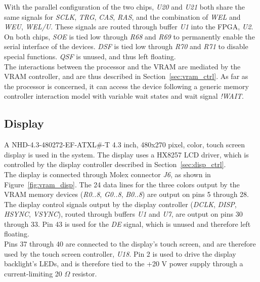 \documentclass[titlepage]{scrartcl}
\begin{document}
	With the parallel configuration of the two chips, \textit{U20} and \textit{U21} both share the same signals for \textit{SCLK}, \textit{TRG}, \textit{CAS}, \textit{RAS}, and the combination of \textit{WEL} and \textit{WEU}, \textit{WEL/U}. These signals are routed through buffer \textit{U1} into the FPGA, \textit{U2}.\\

	On both chips, \textit{SOE} is tied low through \textit{R68} and \textit{R69} to permanently enable the serial interface of the devices. \textit{DSF} is tied low through \textit{R70} and \textit{R71} to disable special functions. \textit{QSF} is unused, and thus left floating.\\

	The interactions between the processor and the VRAM are mediated by the VRAM controller, and are thus described in Section~\ref{sec:vram_ctrl}. As far as the processor is concerned, it can access the device following a generic memory controller interaction model with variable wait states and wait signal \textit{!WAIT}. \\

	\clearpage

	\subsection{Display}
	A NHD-4.3-480272-EF-ATXL\#-T 4.3 inch, 480x270 pixel, color, touch screen display is used in the system. The display uses a HX8257 LCD driver, which is controlled by the display controller described in Section~\ref{sec:disp_ctrl}.\\

	The display is connected through Molex connector \textit{J6}, as shown in Figure~\ref{fig:vram_disp}. The 24 data lines for the three colors output by the VRAM memory devices (\textit{R0..8}, \textit{G0..8}, \textit{B0..8}) are output on pins 5 through 28. The display control signals output by the display controller (\textit{DCLK}, \textit{DISP}, \textit{HSYNC}, \textit{VSYNC}), routed through buffers \textit{U1} and \textit{U7}, are output on pins 30 through 33. Pin 43 is used for the \textit{DE} signal, which is unused and therefore left floating.\\

	Pins 37 through 40 are connected to the display's touch screen, and are therefore used by the touch screen controller, \textit{U18}. Pin 2 is used to drive the display backlight's LEDs, and is therefore tied to the +20 V power supply through a current-limiting 20 $\Omega$ resistor.\\
\end{document}
